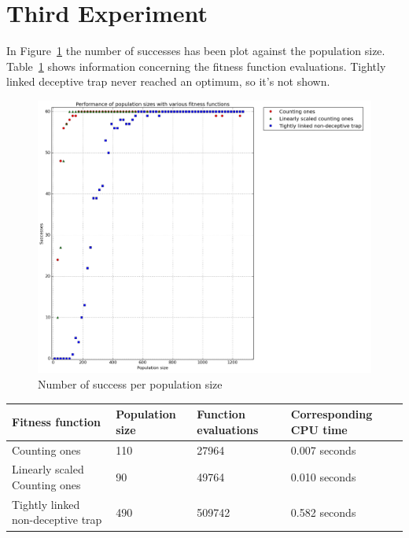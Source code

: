 \documentclass[12pt]{article}
\theoremstyle{definition}
\begin{document}
\section{Third Experiment}
\label{ssec:exp3}
In Figure~\ref{fig:exp3} the number of successes has been plot against the population size.
Table~\ref{tab:exp3} shows information concerning the fitness function evaluations.
Tightly linked deceptive trap never reached an optimum, so it's not shown.

\begin{figure}[!htb]
    \centering
    \includegraphics[totalheight=0.7\textheight]{images/exp3.png}
    \caption{Number of success per population size}
\label{fig:exp3}
\end{figure}

\begin{table}[!htb]
\begin{adjustwidth}{0cm}{}
\centering
\begin{tabular}{lp{2.5cm}p{2.5cm}p{2.8cm}}
\toprule[1.5pt]
\bf Fitness function & \bf Population size & \bf Function evaluations & \bf Corresponding CPU time\\\midrule
Counting ones & 110 & 27964 & 0.007 seconds \\
Linearly scaled Counting ones & 90 & 49764 & 0.010 seconds \\
Tightly linked non-deceptive trap & 490 & 509742 & 0.582 seconds \\
\bottomrule[1.25pt]
\end{tabular}\par
\bigskip
{}
\label{tab:exp3}
\end{adjustwidth}
\end{table}
\end{document}
